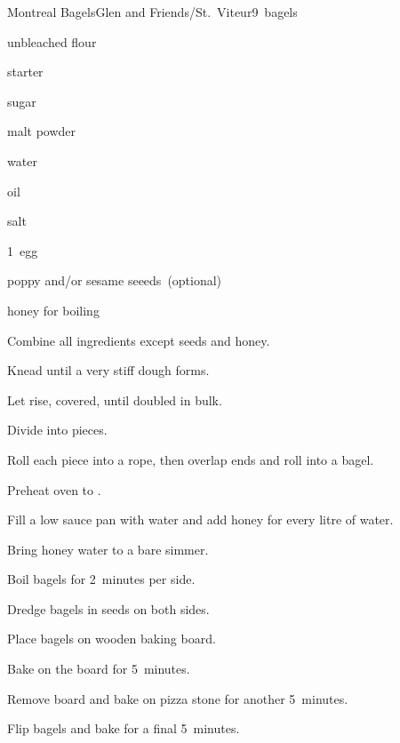 \begin{recipe}{Montreal Bagels}{Glen and Friends/St.~Viteur}{9~bagels}

\begin{ingredients}
\item {} unbleached flour
\item {} starter
\item {} sugar
\item {} malt powder
\item {} water
\item {} oil
\item {} salt
\item 1~egg
\item poppy and/or sesame seeeds~(optional)
\item honey for boiling
\end{ingredients}

\begin{directions}
\item Combine all ingredients except seeds and honey.
\item Knead until a very stiff dough forms.
\item Let rise, covered, until doubled in bulk.
\item Divide into  pieces.
\item Roll each piece into a rope, then overlap ends and roll into a bagel.
\item Preheat oven to .
\item Fill a low sauce pan with water and add  honey for every litre of water.
\item Bring honey water to a bare simmer.
\item Boil bagels for 2~minutes per side.
\item Dredge bagels in seeds on both sides.
\item Place bagels on wooden baking board.
\item Bake on the board for 5~minutes.
\item Remove board and bake on pizza stone for another 5~minutes.
\item Flip bagels and bake for a final 5~minutes.
\end{directions}

\end{recipe}
